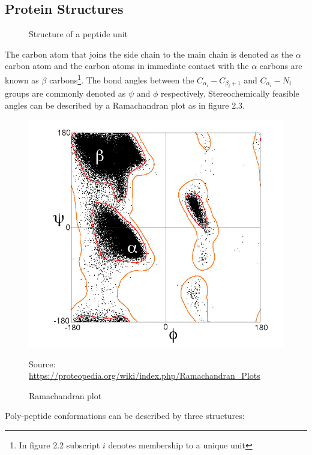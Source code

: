 \subsection{Protein Structures}
\begin{figure}[!htb]
    \caption{Structure of a peptide unit}
    \begin{center}
    \end{center}
\end{figure}

The carbon atom that joins the side chain to
the main chain is denoted as the $\alpha$ carbon
atom and the carbon atoms in immediate contact with the
$\alpha$ carbons are known as $\beta$ 
carbons\footnote{In figure 2.2 subscript $i$ denotes membership to a unique unit}. The bond angles between the $C_{\alpha_i} - C_{\beta_i+1}$
and $C_{\alpha_i} - N_i$ groups are commonly denoted
as $\psi$ and $\phi$ respectively. Stereochemically
feasible angles can be described by a Ramachandran plot as in figure 2.3. \\

 \begin{figure}[!htb]
    \caption{Ramachandran plot}
    \begin{center}
        \includegraphics[scale=0.6]{Figures/RamachandranPlot}
    \end{center}
    \scriptsize{\dag Source: \url{https://proteopedia.org/wiki/index.php/Ramachandran_Plots}}
 \end{figure}
Poly-peptide conformations can be described by three structures:

